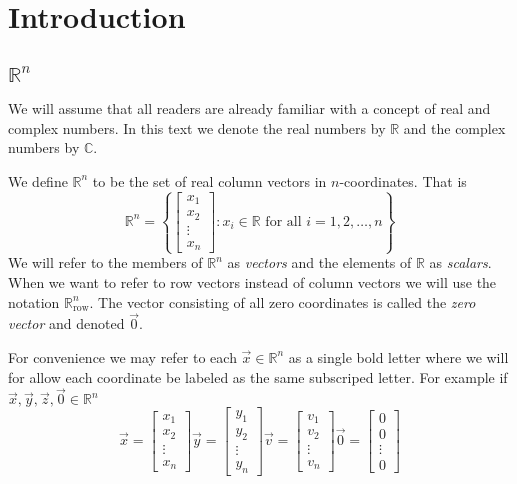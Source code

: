 \section{Introduction}
\subsection{$\mathbb{R}^n$}
We will assume that all readers are already familiar with a concept of real and complex numbers. 
In this text we denote the real numbers by $\mathbb{R}$ and the complex numbers by $\mathbb{C}$. 

\begin{definition}
We define $\mathbb{R}^n$ to be the set of real column vectors in $n$-coordinates. That is 
\[
\mathbb{R}^n=\left\{ 
\begin{bmatrix}
x_1\\ x_2 \\ \vdots \\ x_n
\end{bmatrix} 
: x_i \in \mathbb{R}\text{ for all }i=1,2, \ldots, n \right\}
\]
We will refer to the members of $\mathbb{R}^n$ as \emph{vectors} and the 
elements of $\mathbb{R}$ as \emph{scalars}. When we want to refer to row 
vectors instead of column vectors we will use the notation 
$\mathbb{R}^n_\text{row}$. The vector consisting of all zero coordinates is 
called the \emph{zero vector} and denoted $\vec{0}$.
\end{definition}

For convenience we may refer to each $\vec{x} \in \mathbb{R}^n$ as a single 
bold letter where we will for allow each coordinate be labeled as the same 
subscriped letter. For example if $\vec{x}, \vec{y}, \vec{z}, \vec{0} \in \mathbb{R}^n$
\[
\vec{x}=\begin{bmatrix}x_1\\ x_2 \\ \vdots \\ x_n\end{bmatrix}
\vec{y}=\begin{bmatrix}y_1\\ y_2 \\ \vdots \\ y_n\end{bmatrix}
\vec{v}=\begin{bmatrix}v_1\\ v_2 \\ \vdots \\ v_n\end{bmatrix}
\vec{0}=\begin{bmatrix}0\\ 0 \\ \vdots \\ 0\end{bmatrix}
\]


